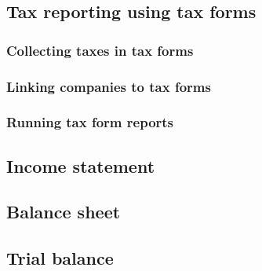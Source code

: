 \subsection{Tax reporting using tax forms}
\label{subsec-workflows-accounting-reporting-tax-with-taxforms}

\subsubsection{Collecting taxes in tax forms}
\label{subsubsec-workflows-accounting-reporting-tax-collecting-taxforms}

\subsubsection{Linking companies to tax forms}
\label{subsubsec-workflows-accounting-reporting-tax-linking-taxforms}

\subsubsection{Running tax form reports}
\label{subsubsec-workflows-accounting-reporting-tax-running-taxforms}


\subsection{Income statement}
\label{subsec-workflows-accounting-reporting-result}


\subsection{Balance sheet}
\label{subsec-workflows-accounting-reporting-balance}

\subsection{Trial balance}
\label{subsec-workflows-accounting-reporting-trial-balance}

